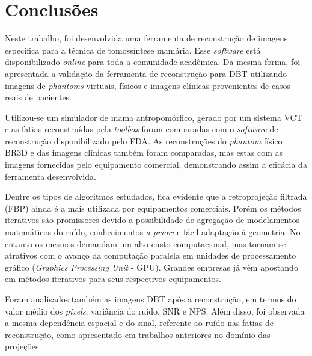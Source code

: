 \chapter[Conclusões]{Conclusões}\label{Capitulo7}

Neste trabalho, foi desenvolvida uma ferramenta de reconstrução de imagens específica para a técnica de tomossíntese mamária. Esse \textit{software} está disponibilizado \textit{online} para toda a comunidade acadêmica. Da mesma forma, foi apresentada a validação da ferramenta de reconstrução para \acs{DBT} utilizando imagens de \textit{phantoms} virtuais, físicos e imagens clínicas provenientes de casos reais de pacientes.  

Utilizou-se um simulador de mama antropomórfico, gerado por um sistema \acs{VCT} e as fatias reconstruídas pela \textit{toolbox} foram comparadas com o \textit{software} de reconstrução disponibilizado pelo \acs{FDA}. As reconstruções do \textit{phantom} físico BR3D e das imagens clínicas também foram comparadas, mas estas com as imagens fornecidas pelo equipamento comercial, demonstrando assim a eficácia da ferramenta desenvolvida. 


Dentre os tipos de algoritmos estudados, fica evidente que a retroprojeção filtrada (\acs{FBP}) ainda é a mais utilizada por equipamentos comerciais. Porém os métodos iterativos são promissores devido a possibilidade de agregação de modelamentos matemáticos do ruído, conhecimentos \textit{a priori} e fácil adaptação à geometria. No entanto os mesmos demandam um alto custo computacional, mas tornam-se atrativos com o avanço da computação paralela em unidades de processamento gráfico (\textit{Graphics Processing Unit} - \acs{GPU}). Grandes empresas já vêm apostando em métodos iterativos para seus respectivos equipamentos.

Foram analisados também as imagens \acs{DBT} após a reconstrução, em termos do valor médio dos \textit{pixels}, variância do ruído, \acs{SNR} e \acs{NPS}. Além disso, foi observada a mesma dependência espacial e do sinal, referente ao ruído nas fatias de reconstrução, como apresentado em trabalhos anteriores no domínio das projeções.

